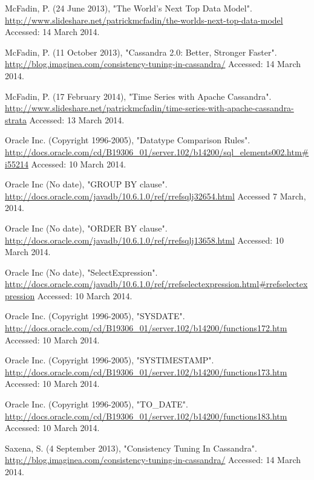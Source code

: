 \documentclass[letterpaper]{article}
\begin{document}
McFadin, P. (24 June 2013), "The World's Next Top Data Model".
\url{http://www.slideshare.net/patrickmcfadin/the-worlds-next-top-data-model}
Accessed: 14 March 2014.

McFadin, P. (11 October 2013), "Cassandra 2.0: Better, Stronger Faster".
\url{http://blog.imaginea.com/consistency-tuning-in-cassandra/}
Accessed: 14 March 2014.

McFadin, P. (17 February 2014), "Time Series with Apache Cassandra".
\url{http://www.slideshare.net/patrickmcfadin/time-series-with-apache-cassandra-strata}
Accessed: 13 March 2014.

Oracle Inc. (Copyright 1996-2005), "Datatype Comparison Rules".
\url{http://docs.oracle.com/cd/B19306_01/server.102/b14200/sql_elements002.htm#i55214}
Accessed: 10 March 2014.

Oracle Inc (No date), "GROUP BY clause".
\url{http://docs.oracle.com/javadb/10.6.1.0/ref/rrefsqlj32654.html}
Accessed 7 March, 2014.

Oracle Inc (No date), "ORDER BY clause".
\url{http://docs.oracle.com/javadb/10.6.1.0/ref/rrefsqlj13658.html}
Accessed: 10 March 2014.

Oracle Inc (No date), "SelectExpression".
\url{http://docs.oracle.com/javadb/10.6.1.0/ref/rrefselectexpression.html#rrefselectexpression}
Accessed: 10 March 2014.

Oracle Inc. (Copyright 1996-2005), "SYSDATE".
\url{http://docs.oracle.com/cd/B19306_01/server.102/b14200/functions172.htm}
Accessed: 10 March 2014.

Oracle Inc. (Copyright 1996-2005), "SYSTIMESTAMP".
\url{http://docs.oracle.com/cd/B19306_01/server.102/b14200/functions173.htm}
Accessed: 10 March 2014.

Oracle Inc. (Copyright 1996-2005), "TO\_DATE".
\url{http://docs.oracle.com/cd/B19306_01/server.102/b14200/functions183.htm}
Accessed: 10 March 2014.

Saxena, S. (4 September 2013), "Consistency Tuning In Cassandra".
\url{http://blog.imaginea.com/consistency-tuning-in-cassandra/}
Accessed: 14 March 2014.
\end{document}

